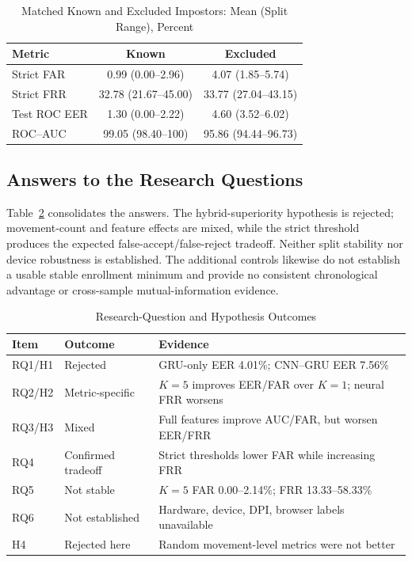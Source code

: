 \documentclass[conference]{IEEEtran}
\begin{document}
\begin{table}[t]
\centering
\caption{Matched Known and Excluded Impostors: Mean (Split Range), Percent}
\label{tab:unseen_control}
\begin{tabular}{lcc}
\toprule
Metric & Known & Excluded \\
\midrule
Strict FAR & 0.99 (0.00--2.96) & 4.07 (1.85--5.74) \\
Strict FRR & 32.78 (21.67--45.00) & 33.77 (27.04--43.15) \\
Test ROC EER & 1.30 (0.00--2.22) & 4.60 (3.52--6.02) \\
ROC--AUC & 99.05 (98.40--100) & 95.86 (94.44--96.73) \\
\bottomrule
\end{tabular}
\end{table}

\subsection{Answers to the Research Questions}

Table~\ref{tab:rq_outcomes} consolidates the answers. The hybrid-superiority
hypothesis is rejected; movement-count and feature effects are mixed, while
the strict threshold produces the expected false-accept/false-reject tradeoff.
Neither split stability nor device robustness is established. The additional
controls likewise do not establish a usable stable enrollment minimum and provide
no consistent chronological advantage or cross-sample mutual-information
evidence.

\begin{table}[t]
\centering
\caption{Research-Question and Hypothesis Outcomes}
\label{tab:rq_outcomes}
\begin{tabular}{lll}
\toprule
\textbf{Item} & \textbf{Outcome} & \textbf{Evidence} \\
\midrule
RQ1/H1 & Rejected & GRU-only EER 4.01\%; CNN--GRU EER 7.56\% \\
RQ2/H2 & Metric-specific & $K=5$ improves EER/FAR over $K=1$; neural FRR worsens \\
RQ3/H3 & Mixed & Full features improve AUC/FAR, but worsen EER/FRR \\
RQ4 & Confirmed tradeoff & Strict thresholds lower FAR while increasing FRR \\
RQ5 & Not stable & $K=5$ FAR 0.00--2.14\%; FRR 13.33--58.33\% \\
RQ6 & Not established & Hardware, device, DPI, browser labels unavailable \\
H4 & Rejected here & Random movement-level metrics were not better \\
\bottomrule
\end{tabular}
\end{table}
\end{document}
